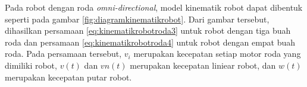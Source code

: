 Pada robot dengan roda \emph{omni-directional},
  model kinematik robot dapat dibentuk seperti pada gambar \ref{fig:diagramkinematikrobot}.
Dari gambar tersebut, dihasilkan persamaan \ref{eq:kinematikrobotroda3} untuk robot dengan tiga buah roda dan persamaan \ref{eq:kinematikrobotroda4} untuk robot dengan empat buah roda.
Pada persamaan tersebut,
  $v_{i}$ merupakan kecepatan setiap motor roda yang dimiliki robot,
  $v(t)$ dan $vn(t)$ merupakan kecepatan liniear robot,
  dan $w(t)$ merupakan kecepatan putar robot.

\begin{equation}
  \label{eq:kinematikrobotroda3}
  
\end{equation}

\begin{equation}
  \label{eq:kinematikrobotroda4}
  
\end{equation}
